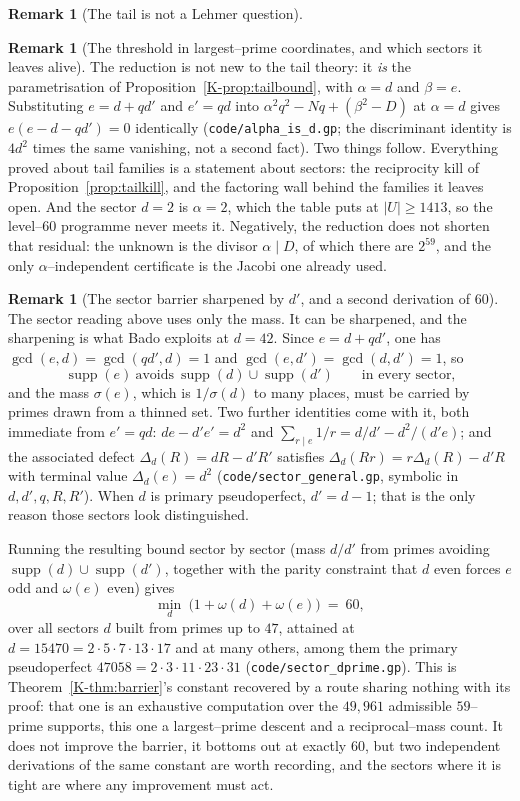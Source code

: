 \documentclass[11pt]{article}
\theoremstyle{definition}
\newtheorem{remark}[theorem]{Remark}
\begin{document}
\begin{remark}[The tail is not a Lehmer question]
\begin{remark}[The threshold in largest--prime coordinates, and which sectors it leaves alive]
The reduction is not new to the tail theory: it \emph{is} the parametrisation of
Proposition~\ref{K-prop:tailbound}, with $\alpha=d$ and $\beta=e$. Substituting $e=d+qd'$ and $e'=qd$
into $\alpha^2q^2-Nq+(\beta^2-D)$ at $\alpha=d$ gives $e(e-d-qd')=0$ identically
\textup{(\texttt{code/alpha\_is\_d.gp}; the discriminant identity is $4d^2$ times the same
vanishing, not a second fact)}. Two things follow. Everything proved about tail families is
a statement about sectors: the reciprocity kill of Proposition~\ref{prop:tailkill}, and the
factoring wall behind the families it leaves open. And the sector $d=2$ is $\alpha=2$, which the
table puts at $|U|\ge1413$, so the level--$60$ programme never meets it. Negatively, the reduction
does not shorten that residual: the unknown is the divisor $\alpha\mid D$, of which there are
$2^{59}$, and the only $\alpha$--independent certificate is the Jacobi one already used.
\end{remark}

\begin{remark}[The sector barrier sharpened by $d'$, and a second derivation of $60$]\label{rem:sectordprime}
The sector reading above uses only the mass. It can be sharpened, and the sharpening is what
Bado \cite{Bado2026b} exploits at $d=42$. Since $e=d+qd'$, one has $\gcd(e,d)=\gcd(qd',d)=1$ and
$\gcd(e,d')=\gcd(d,d')=1$, so
\[ \operatorname{supp}(e)\ \text{avoids}\ \operatorname{supp}(d)\cup\operatorname{supp}(d')
   \qquad\text{in every sector,} \]
and the mass $\sigma(e)$, which is $1/\sigma(d)$ to many places, must be carried by primes drawn
from a thinned set. Two further identities come with it, both immediate from $e'=qd$:
$de-d'e'=d^2$ and $\sum_{r\mid e}1/r=d/d'-d^2/(d'e)$; and the associated defect
$\Delta_d(R)=dR-d'R'$ satisfies $\Delta_d(Rr)=r\Delta_d(R)-d'R$ with terminal value
$\Delta_d(e)=d^2$ \textup{(\texttt{code/sector\_general.gp}, symbolic in $d,d',q,R,R'$)}. When $d$
is primary pseudoperfect, $d'=d-1$; that is the only reason those sectors look distinguished.

Running the resulting bound sector by sector (mass $d/d'$ from primes avoiding
$\operatorname{supp}(d)\cup\operatorname{supp}(d')$, together with the parity constraint that $d$
even forces $e$ odd and $\omega(e)$ even) gives
\[ \min_{d}\ \bigl(1+\omega(d)+\omega(e)\bigr)\ =\ 60, \]
over all sectors $d$ built from primes up to $47$, attained at $d=15470=2\cdot5\cdot7\cdot13\cdot17$
and at many others, among them the primary pseudoperfect $47058=2\cdot3\cdot11\cdot23\cdot31$
\textup{(\texttt{code/sector\_dprime.gp})}. This is Theorem~\ref{K-thm:barrier}'s constant recovered
by a route sharing nothing with its proof: that one is an exhaustive computation over the $49{,}961$
admissible $59$--prime supports, this one a largest--prime descent and a reciprocal--mass count. It
does not improve the barrier, it bottoms out at exactly $60$, but two independent derivations
of the same constant are worth recording, and the sectors where it is tight are where any
improvement must act.


\end{remark}
\end{remark}
\end{document}
